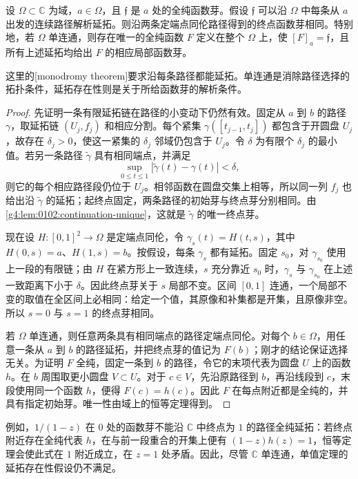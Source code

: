 \begin{theorem}[单值定理]\label{g4:thm:0102:monodromy}
	设 \(\Omega\subset\mathbb C\) 为域，\(a\in\Omega\)，且 \(\mathfrak f\) 是 \(a\) 处的全纯函数芽。假设 \(\mathfrak f\) 可以沿 \(\Omega\) 中每条从 \(a\) 出发的连续路径解析延拓。则沿两条定端点同伦路径得到的终点函数芽相同。特别地，若 \(\Omega\) 单连通，则存在唯一的全纯函数 \(F\) 定义在整个 \(\Omega\) 上，使 \([F]_a=\mathfrak f\)，且所有上述延拓均给出 \(F\) 的相应局部函数芽。
\end{theorem}
这里的[monodromy theorem]要求沿每条路径都能延拓。单连通是消除路径选择的拓扑条件，延拓存在性则是关于所给函数芽的解析条件。
\begin{proof}
	先证明一条有限延拓链在路径的小变动下仍然有效。固定从 \(a\) 到 \(b\) 的路径 \(\gamma\)，取延拓链 \((U_j,f_j)\) 和相应分割。每个紧集 \(\gamma([t_{j-1},t_j])\) 都包含于开圆盘 \(U_j\)，故存在 \(\delta_j>0\)，使这一紧集的 \(\delta_j\) 邻域仍包含于 \(U_j\)。令 \(\delta\) 为有限个 \(\delta_j\) 的最小值。若另一条路径 \(\widetilde\gamma\) 具有相同端点，并满足
	\[
		\sup_{0\leq t\leq1}|\widetilde\gamma(t)-\gamma(t)|<\delta,
	\]
	则它的每个相应路径段仍位于 \(U_j\)。相邻函数在圆盘交集上相等，所以同一列 \(f_j\) 也给出沿 \(\widetilde\gamma\) 的延拓；起终点固定，两条路径的初始芽与终点芽分别相同。由\cref{g4:lem:0102:continuation-unique}，这就是 \(\widetilde\gamma\) 的唯一终点芽。

	现在设 \(H:[0,1]^2\rightarrow\Omega\) 是定端点同伦，令 \(\gamma_s(t)=H(t,s)\)，其中 \(H(0,s)=a\)、\(H(1,s)=b\)。按假设，每条 \(\gamma_s\) 都有延拓。固定 \(s_0\)，对 \(\gamma_{s_0}\) 使用上一段的有限链；由 \(H\) 在紧方形上一致连续，\(s\) 充分靠近 \(s_0\) 时，\(\gamma_s\) 与 \(\gamma_{s_0}\) 在上述一致距离下小于 \(\delta\)。因此终点芽关于 \(s\) 局部不变。区间 \([0,1]\) 连通，一个局部不变的取值在全区间上必相同：给定一个值，其原像和补集都是开集，且原像非空。所以 \(s=0\) 与 \(s=1\) 的终点芽相同。

	若 \(\Omega\) 单连通，则任意两条具有相同端点的路径定端点同伦。对每个 \(b\in\Omega\)，用任意一条从 \(a\) 到 \(b\) 的路径延拓，并把终点芽的值记为 \(F(b)\)；刚才的结论保证选择无关。为证明 \(F\) 全纯，固定一条到 \(b\) 的路径，令它的末项代表为圆盘 \(U\) 上的函数 \(h\)。在 \(b\) 周围取更小圆盘 \(V\subset U\)。对于 \(c\in V\)，先沿原路径到 \(b\)，再沿线段到 \(c\)，末段使用同一个函数 \(h\)，便得 \(F(c)=h(c)\)。因此 \(F\) 在每点附近都是全纯的，并具有指定初始芽。唯一性由域上的恒等定理得到。
\end{proof}

例如，\(1/(1-z)\) 在 \(0\) 处的函数芽不能沿 \(\mathbb C\) 中终点为 \(1\) 的路径全纯延拓：若终点附近存在全纯代表 \(h\)，在与前一段重合的开集上便有 \((1-z)h(z)=1\)，恒等定理会使此式在 \(1\) 附近成立，在 \(z=1\) 处矛盾。因此，尽管 \(\mathbb C\) 单连通，单值定理的延拓存在性假设仍不满足。

